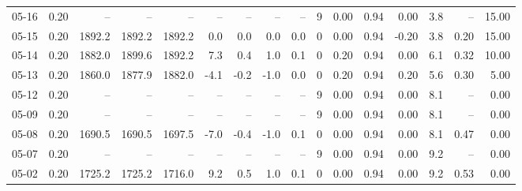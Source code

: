 \begin{threeparttable}
{\begin{tabular}{lrrrrrrrrrrrrrrr}
  05-16 &     0.20 &     -- &     -- &     -- &         -- &             -- &                       -- &                  -- &              9 &       0.00 &      0.94 &           0.00 &              3.8 &              -- &                  15.00 \\
  05-15 &     0.20 & 1892.2 & 1892.2 & 1892.2 &        0.0 &            0.0 &                      0.0 &                 0.0 &              0 &       0.00 &      0.94 &          -0.20 &              3.8 &            0.20 &                  15.00 \\
  05-14 &     0.20 & 1882.0 & 1899.6 & 1892.2 &        7.3 &            0.4 &                      1.0 &                 0.1 &              0 &       0.20 &      0.94 &           0.00 &              6.1 &            0.32 &                  10.00 \\
  05-13 &     0.20 & 1860.0 & 1877.9 & 1882.0 &       -4.1 &           -0.2 &                     -1.0 &                 0.0 &              0 &       0.20 &      0.94 &           0.20 &              5.6 &            0.30 &                   5.00 \\
  05-12 &     0.20 &     -- &     -- &     -- &         -- &             -- &                       -- &                  -- &              9 &       0.00 &      0.94 &           0.00 &              8.1 &              -- &                   0.00 \\
  05-09 &     0.20 &     -- &     -- &     -- &         -- &             -- &                       -- &                  -- &              9 &       0.00 &      0.94 &           0.00 &              8.1 &              -- &                   0.00 \\
  05-08 &     0.20 & 1690.5 & 1690.5 & 1697.5 &       -7.0 &           -0.4 &                     -1.0 &                 0.1 &              0 &       0.00 &      0.94 &           0.00 &              8.1 &            0.47 &                   0.00 \\
  05-07 &     0.20 &     -- &     -- &     -- &         -- &             -- &                       -- &                  -- &              9 &       0.00 &      0.94 &           0.00 &              9.2 &              -- &                   0.00 \\
  05-02 &     0.20 & 1725.2 & 1725.2 & 1716.0 &        9.2 &            0.5 &                      1.0 &                 0.1 &              0 &       0.00 &      0.94 &           0.00 &              9.2 &            0.53 &                   0.00 \\

\end{tabular}}
\end{threeparttable}
